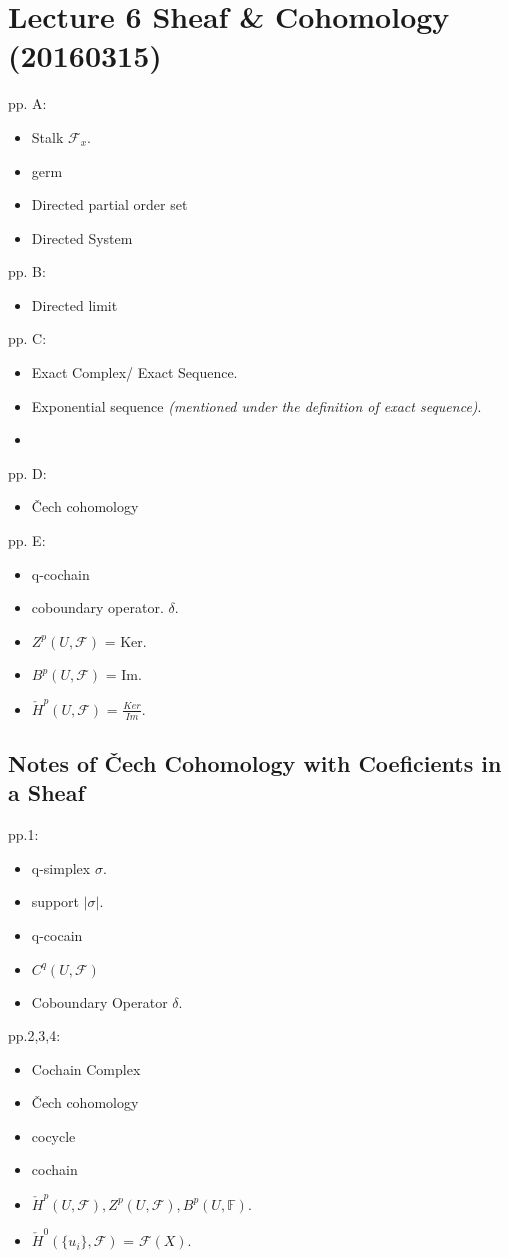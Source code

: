 \section{Lecture 6 Sheaf \& Cohomology (20160315)} pp. A:
    \begin{itemize}
        \item Stalk $\mathcal{F}_x$.
        \item germ
        \item Directed partial order set
        \item Directed System
    \end{itemize}
pp. B:
    \begin{itemize}
        \item Directed limit
    \end{itemize}
pp. C:
\begin{itemize}
    \item Exact Complex/ Exact Sequence.
    \item Exponential sequence \textit{(mentioned under the definition of exact sequence)}.
    \item
\end{itemize}
pp. D:
\begin{itemize}
    \item Čech cohomology
\end{itemize}
pp. E:
\begin{itemize}
    \item q-cochain
    \item coboundary operator. $\delta$.
    \item $Z^p(U,\mathcal{F})$ = Ker.
    \item $B^p(U,\mathcal{F})$ = Im.
    \item $\check{H}^p(U,\mathcal{F})$ = $\frac{Ker}{Im}$.
\end{itemize}

    \subsection{Notes of \v{C}ech Cohomology with Coeficients in a Sheaf}
    pp.1:
    \begin{itemize}
        \item q-simplex $\sigma$.
        \item support $|\sigma|$.
        \item q-cocain
        \item $C^q(U,\mathcal{F})$
        \item Coboundary Operator $\delta$.
    \end{itemize}
    pp.2,3,4:
    \begin{itemize}
        \item Cochain Complex
        \item Čech cohomology
        \item cocycle
        \item cochain
        \item $\check{H}^p(U,\mathcal{F}),Z^p(U,\mathcal{F}),B^p(U,\mathbb{F})$.
        \item $\check{H}^0(\{u_i\},\mathcal{F})$ = $\mathcal{F}(X)$.
    \end{itemize}
	
